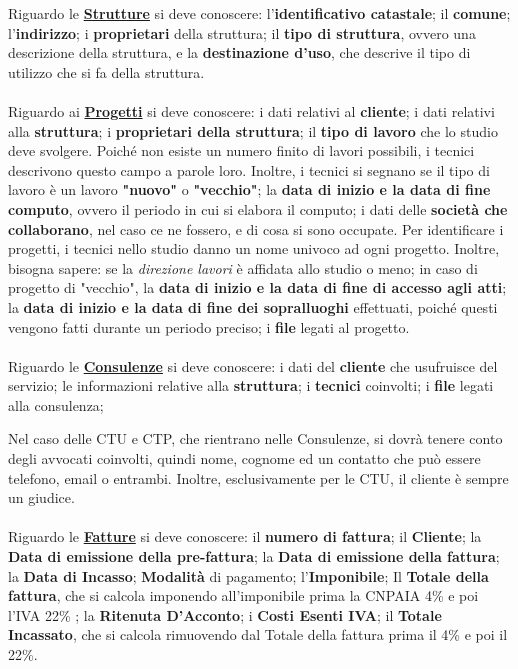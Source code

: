 \documentclass{elegantbook}
\begin{document}
	Riguardo le \underline{\textbf{Strutture}} si deve conoscere: l'\textbf{identificativo catastale}; il \textbf{comune};
        l'\textbf{indirizzo}; i \textbf{proprietari} della struttura; il \textbf{tipo di struttura}, ovvero una descrizione della
        struttura, e la \textbf{destinazione d'uso}, che descrive il tipo di utilizzo che si fa della struttura.
	\\\\
	
	Riguardo ai \underline{\textbf{Progetti}} si deve conoscere: i dati relativi al \textbf{cliente}; i dati relativi alla
        \textbf{struttura}; i \textbf{proprietari della struttura}; il \textbf{tipo di lavoro} che lo studio deve svolgere.
        Poiché non esiste un numero finito di lavori possibili, i tecnici descrivono questo campo a parole loro. Inoltre, i
        tecnici si segnano se il tipo di lavoro è un lavoro \textbf{"nuovo"} o \textbf{"vecchio"}; la \textbf{data di inizio e
        la data di fine computo}, ovvero il periodo in cui si elabora il computo; i dati delle \textbf{società che collaborano},
        nel caso ce ne fossero, e di cosa si sono occupate. Per identificare i progetti, i tecnici nello studio danno un nome
        univoco ad ogni progetto. Inoltre, bisogna sapere: se la \textit{direzione lavori} è affidata allo studio o meno; in
        caso di progetto di "vecchio", la \textbf{data di inizio e la data di fine di accesso agli atti}; la
        \textbf{data di inizio e la data di fine dei sopralluoghi} effettuati, poiché questi vengono fatti durante un periodo
        preciso; i \textbf{file} legati al progetto.
	\\\\
	
	Riguardo le \underline{\textbf{Consulenze}} si deve conoscere: i dati del \textbf{cliente} che usufruisce del servizio;
        le informazioni relative alla \textbf{struttura}; i \textbf{tecnici} coinvolti;
        i \textbf{file} legati alla consulenza; 
	
	Nel caso delle CTU e CTP, che rientrano nelle Consulenze, si dovrà tenere conto degli avvocati coinvolti, quindi nome,
        cognome ed un contatto che può essere telefono, email o entrambi. Inoltre, esclusivamente per le CTU, il cliente è sempre un giudice.
	\\\\
	
	Riguardo le \underline{\textbf{Fatture}} si deve conoscere: il \textbf{numero di fattura}; il \textbf{Cliente}; la
        \textbf{Data di emissione della pre-fattura}; la \textbf{Data di emissione della fattura}; la \textbf{Data di Incasso};
        \textbf{Modalità} di pagamento; l'\textbf{Imponibile}; Il \textbf{Totale della fattura}, che si calcola imponendo
        all'imponibile prima la CNPAIA 4\% e poi l'IVA 22\% ; la \textbf{Ritenuta D'Acconto}; i \textbf{Costi Esenti IVA}; il
        \textbf{Totale Incassato}, che si calcola rimuovendo dal Totale della fattura prima il 4\% e poi il 22\%.
	
\end{document}
